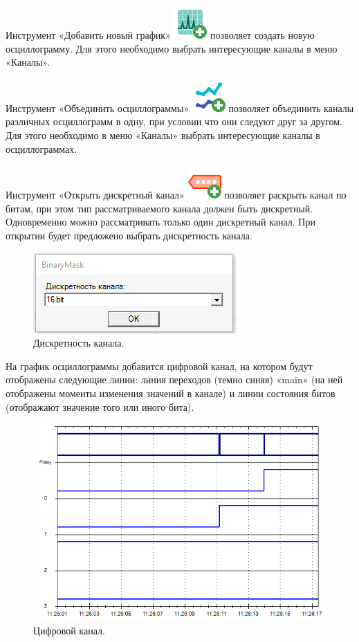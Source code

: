 \documentclass[a4paper,12pt]{article}
\begin{document}
 
Инструмент «Добавить новый график» \includegraphics[width=4ex]{image/Chromatography.png} позволяет создать новую осциллограмму. Для этого необходимо выбрать интересующие каналы в меню «Каналы».  
 
 
Инструмент «Объединить осциллограммы» \includegraphics[width=4ex]{image/Line_Chart.png} позволяет объединить каналы различных осциллограмм в одну, при условии что они следуют друг за другом. Для этого необходимо в меню «Каналы» выбрать интересующие каналы в осциллограммах.  
 
 
Инструмент «Открыть дискретный канал» \includegraphics[width=4ex]{image/Dig_Add.png} позволяет раскрыть канал по битам, при этом тип рассматриваемого канала должен быть дискретный. Одновременно можно рассматривать только один дискретный канал. При открытии будет предложено выбрать дискретность канала. 
 
 
\begin{figure}[h] 
\centering 
\includegraphics[width=40ex]{image/BinaryMask.png} 
\caption{Дискретность канала.} 
\end{figure} 
 
 
На график осциллограммы добавится цифровой канал, на котором будут отображены следующие линии: линия переходов (темно синяя) «main» (на ней отображены моменты изменения значений в канале) и линии состояния битов (отображают значение того или иного бита). 
 
 
\begin{figure}[h] 
\centering 
\includegraphics[width=70ex]{image/Screenshot_10.png} 
\caption{Цифровой канал.} 
\end{figure} 
 
\end{document}
